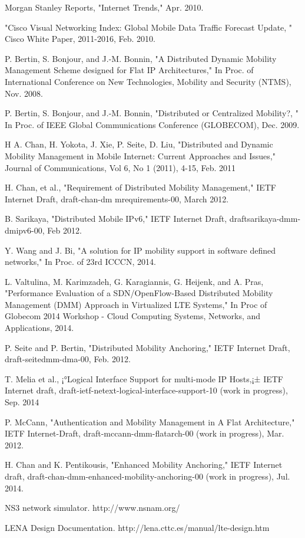 \documentclass[runningheads,a4paper]{llncs}
\begin{document}
\begin{thebibliography}{4}

 Morgan Stanley Reports, "Internet Trends," Apr. 2010.

 "Cisco Visual Networking Index: Global Mobile Data Traffic Forecast Update, " Cisco White Paper, 2011-2016, Feb. 2010.

 P. Bertin, S. Bonjour, and J.-M. Bonnin, "A Distributed Dynamic Mobility Management Scheme designed for Flat IP Architectures," In Proc. of International Conference on New Technologies, Mobility and Security (NTMS), Nov. 2008.

 P. Bertin, S. Bonjour, and J.-M. Bonnin, "Distributed or Centralized Mobility?, " In Proc. of IEEE Global Communications Conference (GLOBECOM), Dec. 2009.

 H A. Chan, H. Yokota, J. Xie, P. Seite, D. Liu, "Distributed and Dynamic Mobility Management in Mobile Internet: Current Approaches and Issues," Journal of Communications, Vol 6, No 1 (2011), 4-15, Feb. 2011

 H. Chan, et al., "Requirement of Distributed Mobility Management," IETF Internet Draft, draft-chan-dm mrequirements-00, March 2012.

 B. Sarikaya, "Distributed Mobile IPv6," IETF Internet Draft, draftsarikaya-dmm-dmipv6-00, Feb 2012.

 Y. Wang and J. Bi, "A solution for IP mobility support in software defined networks," In Proc. of 23rd ICCCN, 2014.

 L. Valtulina, M. Karimzadeh, G. Karagiannis, G. Heijenk, and A. Pras, "Performance Evaluation of a SDN/OpenFlow-Based Distributed Mobility Management (DMM) Approach in Virtualized LTE Systems," In Proc of Globecom 2014 Workshop - Cloud Computing Systems, Networks, and Applications, 2014.

 P. Seite and P. Bertin, "Distributed Mobility Anchoring," IETF Internet Draft, draft-seitedmm-dma-00, Feb. 2012.

 T. Melia et al., ¡°Logical Interface Support for multi-mode IP Hosts,¡± IETF Internet draft, draft-ietf-netext-logical-interface-support-10 (work in progress), Sep. 2014

 P. McCann, "Authentication and Mobility Management in A Flat Architecture," IETF Internet-Draft, draft-mccann-dmm-flatarch-00 (work in progress), Mar. 2012.

 H. Chan and K. Pentikousis, "Enhanced Mobility Anchoring," IETF Internet draft, draft-chan-dmm-enhanced-mobility-anchoring-00 (work in progress), Jul. 2014.

 NS3 network simulator. http://www.nsnam.org/

 LENA Design Documentation. http://lena.cttc.es/manual/lte-design.htm

\end{thebibliography}
\end{document}
